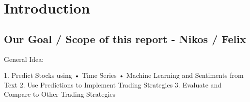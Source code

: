 \chapter{Introduction}\label{ch:Optimization}
\section{Our Goal / Scope of this report - Nikos / Felix }


General Idea: 

1. Predict Stocks using
• Time Series
• Machine Learning and Sentiments from Text
2. Use Predictions to Implement Trading Strategies
3. Evaluate and Compare to Other Trading Strategies
